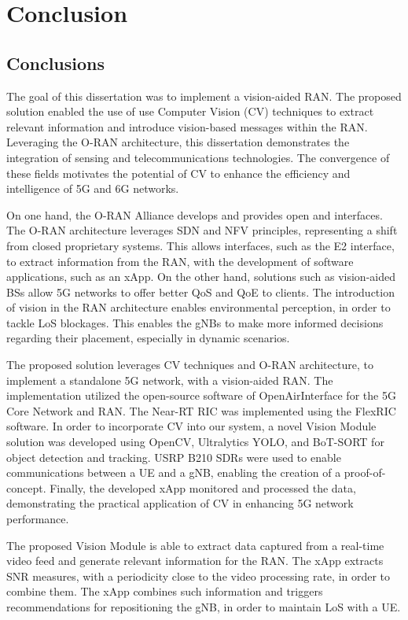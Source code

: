 \hfill
\newpage
\chapter{Conclusion}\label{ch:conclusion}

\section{Conclusions}\label{sec:conclusions}
The goal of this dissertation was to implement a vision-aided RAN\@.
The proposed solution enabled the use of use Computer Vision (CV) techniques to extract relevant information and introduce vision-based messages within the RAN\@.
Leveraging the O-RAN architecture, this dissertation demonstrates the integration of sensing and telecommunications technologies.
The convergence of these fields motivates the potential of CV to enhance the efficiency and intelligence of 5G and 6G networks.

On one hand, the O-RAN Alliance develops and provides open and interfaces.
The O-RAN architecture leverages SDN and NFV principles, representing a shift from closed proprietary systems.
This allows interfaces, such as the E2 interface, to extract information from the RAN, with the development of software applications, such as an xApp.
On the other hand, solutions such as vision-aided BSs allow 5G networks to offer better QoS and QoE to clients.
The introduction of vision in the RAN architecture enables environmental perception, in order to tackle LoS blockages.
This enables the gNBs to make more informed decisions regarding their placement, especially in dynamic scenarios.

The proposed solution leverages CV techniques and O-RAN architecture, to implement a standalone 5G network, with a vision-aided RAN\@.
The implementation utilized the open-source software of OpenAirInterface for the 5G Core Network and RAN\@.
The Near-RT RIC was implemented using the FlexRIC software.
In order to incorporate CV into our system, a novel Vision Module solution was developed using OpenCV, Ultralytics YOLO, and BoT-SORT for object detection and tracking.
USRP B210 SDRs were used to enable communications between a UE and a gNB, enabling the creation of a proof-of-concept.
Finally, the developed xApp monitored and processed the data, demonstrating the practical application of CV in enhancing 5G network performance.

The proposed Vision Module is able to extract data captured from a real-time video feed and generate relevant information for the RAN\@.
The xApp extracts SNR measures, with a periodicity close to the video processing rate, in order to combine them.
The xApp combines such information and triggers recommendations for repositioning the gNB, in order to maintain LoS with a UE\@.

